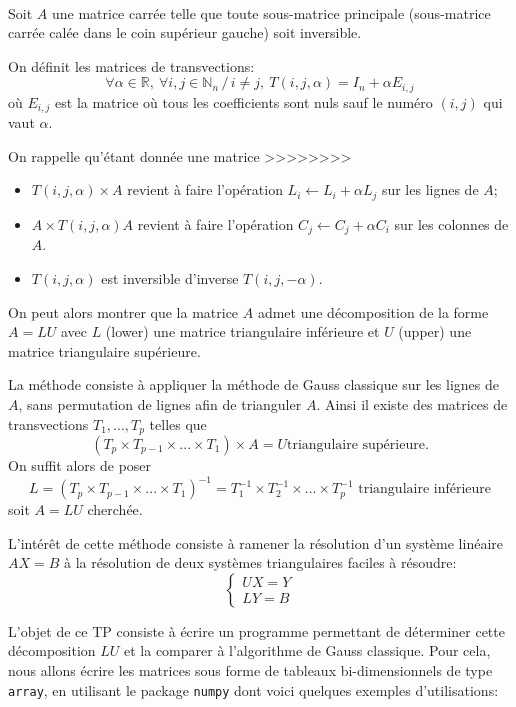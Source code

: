 \setcounter{numques}{0}~\\
\vskip1cm

Soit $A$ une matrice carrée telle que toute sous-matrice principale (sous-matrice carrée calée dans le coin supérieur gauche) soit inversible.

On définit les matrices de transvections: $$\forall \alpha\in {\mathbb R},\ \forall i,j\in {\mathbb N}_n\,/\,  i\ne j , \ T(i,j,\alpha)=I_n+\alpha E_{i,j}$$
où $E_{i,j}$ est la matrice où tous les coefficients sont nuls sauf le numéro $(i,j)$ qui vaut $\alpha$.


On rappelle qu'étant donnée une matrice >>>>>>>> %
\begin{itemize}
\item $T(i,j,\alpha)\times A$ revient à faire l'opération $L_i\leftarrow L_i+\alpha L_j$ sur les lignes de $A$;
\item $A\times T(i,j,\alpha)A$ revient à faire l'opération $C_j\leftarrow C_j+\alpha C_i$ sur les colonnes de $A$.
\item $T(i,j,\alpha)$ est inversible d'inverse $T(i,j,-\alpha)$.
\end{itemize}

On peut alors montrer que la matrice $A$ admet une décomposition de la forme $A=LU$ avec $L$ (lower) une matrice triangulaire inférieure et $U$ (upper) une matrice triangulaire supérieure.


La méthode consiste à appliquer la méthode de Gauss classique sur les lignes de $A$, sans permutation de lignes afin de trianguler $A$. Ainsi il existe des matrices de transvections $T_1,...,T_p$ telles que $$(T_p\times T_{p-1}\times ...\times T_1)\times A=U \textrm{triangulaire supérieure}.$$
On suffit alors de poser $$L=(T_p\times T_{p-1}\times ...\times T_1)^{-1}=T_1^{-1}\times T_2^{-1}\times ...\times T_p^{-1} \textrm{ triangulaire inférieure}$$ soit $A=LU$ cherchée.

L'intérêt de cette méthode consiste à ramener la résolution d'un système linéaire $AX=B$ à la résolution de deux systèmes triangulaires faciles à résoudre: $$\left\{\begin{array}{l}UX=Y\\LY=B\end{array}\right.$$


L'objet de ce TP consiste à écrire un programme permettant de déterminer cette décomposition $LU$ et la comparer à l'algorithme de Gauss classique.
Pour cela, nous allons écrire les matrices sous forme de tableaux bi-dimensionnels de type \texttt{array}, en utilisant le package \texttt{numpy} dont voici quelques exemples d'utilisations:

